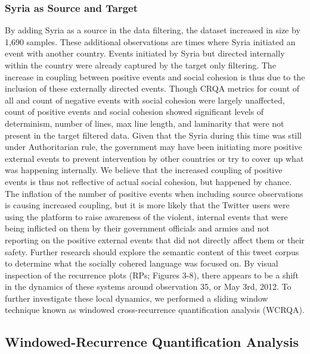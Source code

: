 \documentclass[english,man]{apa6}
\begin{document}
\hypertarget{syria-as-source-and-target-2}{%
\subsubsection{Syria as Source and Target}\label{syria-as-source-and-target-2}}

By adding Syria as a source in the data filtering, the dataset increased in size by 1,690 samples. These additional observations are times where Syria initiated an event with another country. Events initiated by Syria but directed internally within the country were already captured by the target only filtering. The increase in coupling between positive events and social cohesion is thus due to the inclusion of these externally directed events. Though CRQA metrics for count of all and count of negative events with social cohesion were largely unaffected, count of positive events and social cohesion showed significant levels of determinism, number of lines, max line length, and laminarity that were not present in the target filtered data. Given that the Syria during this time was still under Authoritarian rule, the government may have been initiating more positive external events to prevent intervention by other countries or try to cover up what was happening internally. We believe that the increased coupling of positive events is thus not reflective of actual social cohesion, but happened by chance. The inflation of the number of positive events when including source observations is causing increased coupling, but it is more likely that the Twitter users were using the platform to raise awareness of the violent, internal events that were being inflicted on them by their government officials and armies and not reporting on the positive external events that did not directly affect them or their safety. Further research should explore the semantic content of this tweet corpus to determine what the socially cohered language was focused on.
By visual inspection of the recurrence plots (RPs; Figures 3-8), there appears to be a shift in the dynamics of these systems around observation 35, or May 3rd, 2012. To further investigate these local dynamics, we performed a sliding window technique known as windowed cross-recurrence quantification analysis (WCRQA).

\hypertarget{windowed-recurrence-quantification-analysis}{%
\subsection{Windowed-Recurrence Quantification Analysis}\label{windowed-recurrence-quantification-analysis}}
\end{document}
